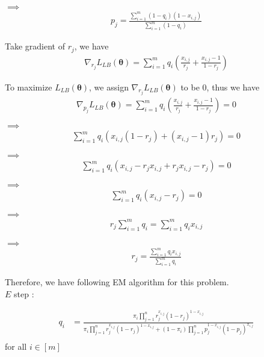 \documentclass[twoside,11pt]{homework}
\begin{document}
$\implies$
\begin{align*}
p_j = \frac  {\sum _ {i = 1} ^ {m} (1 - q_i)(1 - x_{i, j})} {\sum _ {i = 1} ^ {m} (1 - q_i)}
\end{align*}

Take gradient of $r_j$, we have
\begin{align*}
\nabla_{r_j} L_{LB}( \pmb \theta)= \sum _ {i = 1} ^ {m} q_i ( \frac {x _ {i, j}}{ r_j}  + \frac {x_{i, j} - 1} {1 - r_j } )
\end{align*}


To maximize $L_{LB}(\pmb \theta)$, we assign $\nabla_{r_j} L_{LB}( \pmb \theta)$ to be 0, thus we have 
\begin{align*}
\nabla_{p_j} L_{LB} ( \pmb \theta) = \sum _ {i = 1} ^ {m} q_i ( \frac {x _ {i, j}}{ r_j}  + \frac {x_{i, j} - 1} {1 - r_j }) = 0
\end{align*}

$\implies$
\begin{align*}
\sum _ {i = 1} ^ {m} q_i ( x _ {i, j}(1 - r_j ) + ({x_{i, j} - 1}){ r_j} ) = 0
\end{align*}


$\implies$
\begin{align*}
\sum _ {i = 1} ^ {m} q_i (x _ {i, j} -  r_j x _ {i, j} + r_j x _ {i, j}  - r_j ) = 0
\end{align*}


$\implies$
\begin{align*}
\sum _ {i = 1} ^ {m} q_i (x _ {i, j} - r_j ) = 0
\end{align*}


$\implies$
\begin{align*}
r_j \sum _ {i = 1} ^ {m} q_i  = \sum _ {i = 1} ^ {m} q_i x _ {i, j} 
\end{align*}


$\implies$
\begin{align*}
r_j =  \frac {\sum _ {i = 1} ^ {m} q_i x _ {i, j} } {\sum _ {i = 1} ^ {m} q_i }
\end{align*}


Therefore, we have following EM algorithm for this problem. \\
${E}$ step :

\begin{align*} 
q_i & = \frac {\pi _i  \prod _ {j =1} ^ n  r _ j ^ {x_{i, j}}  (1-r_j)^{1- x_{i,j}}}  {\pi _i  \prod _ {j =1} ^ n  r _ j ^ {x_{i, j}}  (1-r_j)^{1- x_{i,j}} + (1 - \pi _i)  \prod _ {j =1} ^ n  p _ j ^ {1 - x_{i, j}}  (1-p_j)^{x_{i,j}}}\\
\end{align*}
for all $i \in [m]$
\end{document}
